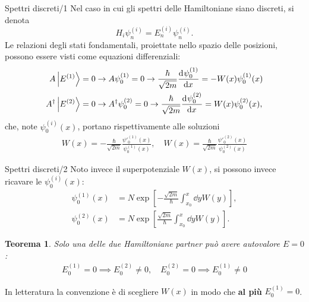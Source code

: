\documentclass[11pt,aspectratio=169,handout]{beamer}
\newtheorem{teo}[theorem]{Teorema}
\begin{document}
\begin{frame}{Spettri discreti/1}
    Nel caso in cui gli spettri delle Hamiltoniane siano discreti, si denota
    $$H_i \psi_n^{(i)} = E_n^{(i)}\psi_n^{(i)}.$$
    Le relazioni degli stati fondamentali, proiettate nello spazio delle
    posizioni, possono essere visti come equazioni differenziali:
    \begin{align*}
        A\ket{E^{(1)}} = 0& \rightarrow A\psi_0^{(1)}=0\to 
        \frac{\hbar }{\sqrt{2m}}\dv[]{\psi_0^{(1)}}{x} = -W(x)\psi_0^{(1)}(x)\\
        A^\dagger\ket{E^{(2)}}=0 &\rightarrow A^\dagger\psi_0^{(2)}=0\to
        \frac{\hbar }{\sqrt{2m}}\dv[]{\psi_0^{(2)}}{x} = W(x)\psi_0^{(2)}(x),
    \end{align*}
    che, note $\psi_0^{(i)}(x)$, portano rispettivamente alle soluzioni
    \begin{gather*}
        W(x) = -\frac{\hbar }{\sqrt{2m}}\frac{\psi'^{(1)}_0(x)}{\psi_0^{(1)}(x)},
        \quad
        W(x) = \frac{\hbar }{\sqrt{2m}}\frac{\psi'^{(2)}_0(x)}{\psi_0^{(2)}(x)}
    \end{gather*}
\end{frame}
\begin{frame}{Spettri discreti/2}
    Noto invece il superpotenziale $W(x)$, si possono invece ricavare le
    $\psi_0^{(i)}(x)$:
    \begin{align*}
        \psi_0^{(1)}(x) &= N\exp\left[ -\frac{\sqrt{2m}}{\hbar}\int_{x_0}^{x}
        \dd y W(y)\right],\\
        \psi_0^{(2)}(x) &= N\exp\left[ \frac{\sqrt{2m}}{\hbar}\int_{x_0}^{x}
        \dd y W(y)\right].
    \end{align*}
    \begin{teo}
        Solo una delle due Hamiltoniane partner può avere autovalore $E=0$:
        \begin{gather*}
            E_0^{(1)}=0\implies E_0^{(2)}\neq 0,\quad
            E_0^{(2)}=0\implies E_0^{(1)}\neq 0
        \end{gather*}
    \end{teo}
    In letteratura la convenzione è di scegliere $W(x)$ in modo che
    \textbf{al più} $E^{(1)}_0=0$.
\end{frame}
\end{document}
